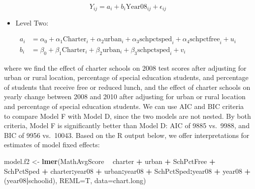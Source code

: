 \documentclass[
]{krantz}
\newenvironment{Shaded}{\begin{snugshade}}{\end{snugshade}}
\newcommand{\DataTypeTok}[1]{\textcolor[rgb]{0.27,0.27,0.27}{#1}}
\newcommand{\KeywordTok}[1]{\textcolor[rgb]{0.27,0.27,0.27}{\textbf{#1}}}
\newcommand{\NormalTok}[1]{#1}
\newcommand{\OperatorTok}[1]{\textcolor[rgb]{0.43,0.43,0.43}{\textbf{#1}}}
\newcommand{\StringTok}[1]{\textcolor[rgb]{0.5,0.5,0.5}{#1}}
\providecommand{\tightlist}{%
  \setlength{\itemsep}{0pt}\setlength{\parskip}{0pt}}
\begin{document}
\begin{equation*}
Y_{ij}= a_{i} + b_{i}\textrm{Year08}_{ij} + \epsilon_{ij}
\end{equation*}

\begin{itemize}
\tightlist
\item
  Level Two:
\end{itemize}

\begin{align*}
a_{i} & = \alpha_{0} + \alpha_{1}\textrm{Charter}_i + \alpha_{2}\textrm{urban}_i + \alpha_{3}\textrm{schpctsped}_i + \alpha_{4}\textrm{schpctfree}_i + u_{i} \\
b_{i} & = \beta_{0} + \beta_{1}\textrm{Charter}_i + \beta_{2}\textrm{urban}_i + \beta_{3}\textrm{schpctsped}_i + v_{i}
\end{align*}

where we find the effect of charter schools on 2008 test scores after adjusting for urban or rural location, percentage of special education students, and percentage of students that receive free or reduced lunch, and the effect of charter schools on yearly change between 2008 and 2010 after adjusting for urban or rural location and percentage of special education students. We can use AIC and BIC criteria to compare Model F with Model D, since the two models are not nested. By both criteria, Model F is significantly better than Model D: AIC of 9885 vs.~9988, and BIC of 9956 vs.~10043. Based on the R output below, we offer interpretations for estimates of model fixed effects:

\begin{Shaded}
\begin{Highlighting}[]
\NormalTok{model.f2 <-}\StringTok{ }\KeywordTok{lmer}\NormalTok{(MathAvgScore }\OperatorTok{~}\StringTok{ }\NormalTok{charter }\OperatorTok{+}\StringTok{ }\NormalTok{urban }\OperatorTok{+}\StringTok{ }\NormalTok{SchPctFree }\OperatorTok{+}\StringTok{ }
\StringTok{  }\NormalTok{SchPctSped }\OperatorTok{+}\StringTok{ }\NormalTok{charter}\OperatorTok{:}\NormalTok{year08 }\OperatorTok{+}\StringTok{ }\NormalTok{urban}\OperatorTok{:}\NormalTok{year08 }\OperatorTok{+}\StringTok{ }
\StringTok{  }\NormalTok{SchPctSped}\OperatorTok{:}\NormalTok{year08 }\OperatorTok{+}\StringTok{ }\NormalTok{year08 }\OperatorTok{+}
\StringTok{  }\NormalTok{(year08}\OperatorTok{|}\NormalTok{schoolid), }\DataTypeTok{REML=}\NormalTok{T, }\DataTypeTok{data=}\NormalTok{chart.long)}
\end{Highlighting}
\end{Shaded}
\end{document}
